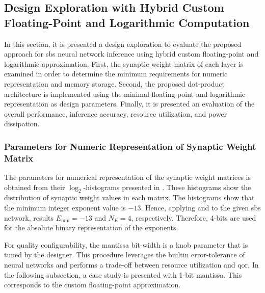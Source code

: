 \subsection{Design Exploration with Hybrid Custom Floating-Point and Logarithmic Computation}

In this section, it is presented a design exploration to evaluate the proposed approach for \gls{sbs} neural network inference using hybrid custom floating-point and logarithmic approximation. First, the synaptic weight matrix of each layer is examined in order to determine the minimum requirements for numeric representation and memory storage. Second, the proposed dot-product architecture is implemented using the minimal floating-point and logarithmic representation as design parameters. Finally, it is presented an evaluation of the overall performance, inference accuracy, resource utilization, and power dissipation.

\subsubsection{Parameters for Numeric Representation of Synaptic Weight Matrix}
\label{sec:parameters}

	The parameters for numerical representation of the synaptic weight matrices is obtained from their $\log_2$-histograms presented in {}. These histograms show the distribution of synaptic weight values in each matrix. The histograms show that the minimum integer exponent value is $-13$. Hence, applying {} and {} to the given \gls{sbs} network, results $E_{\min}=-13$ and $N_E=4$, respectively. Therefore, 4-bits are used for the absolute binary representation of the exponents.


For quality configurability, the mantissa bit-width is a knob parameter that is tuned by the designer. This procedure leverages the builtin error-tolerance of neural networks and performs a trade-off between resource utilization and \gls{qor}. In the following subsection, a case study is presented with 1-bit mantissa. This corresponds to the custom floating-point approximation.

